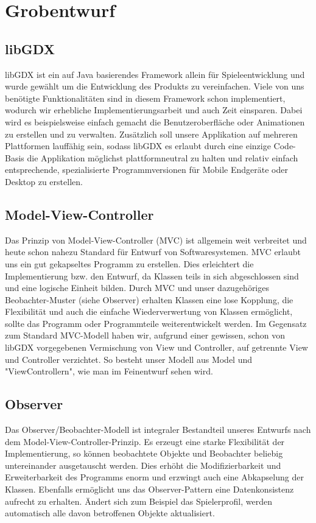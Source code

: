 \section{Grobentwurf}

\subsection{libGDX}
libGDX ist ein auf Java basierendes Framework allein für Spieleentwicklung und wurde gewählt um die Entwicklung des Produkts zu vereinfachen.
Viele von uns benötigte Funktionalitäten sind in diesem Framework schon implementiert, wodurch wir erhebliche Implementierungsarbeit und auch Zeit einsparen.
Dabei wird es beispielsweise einfach gemacht die Benutzeroberfläche oder Animationen zu erstellen und zu verwalten.
Zusätzlich soll unsere Applikation auf mehreren Plattformen lauffähig sein, sodass libGDX es erlaubt durch eine einzige Code-Basis die Applikation möglichst plattformneutral zu halten 
und relativ einfach entsprechende, spezialisierte Programmversionen für Mobile Endgeräte oder Desktop zu erstellen.

\subsection{Model-View-Controller}
Das Prinzip von Model-View-Controller (MVC) ist allgemein weit verbreitet und heute schon nahezu Standard für Entwurf von Softwaresystemen. 
MVC erlaubt uns ein gut gekapseltes Programm zu erstellen. Dies erleichtert die Implementierung bzw. den Entwurf, da Klassen teils in sich abgeschlossen sind
und eine logische Einheit bilden. Durch MVC und unser dazugehöriges Beobachter-Muster (siehe Observer) erhalten Klassen eine lose Kopplung,
die Flexibilität und auch die einfache Wiederverwertung von Klassen ermöglicht, sollte das Programm oder Programmteile weiterentwickelt werden.
Im Gegensatz zum Standard MVC-Modell haben wir, aufgrund einer gewissen, schon von libGDX vorgegebenen Vermischung von View und Controller,
auf getrennte View und Controller verzichtet. So besteht unser Modell aus Model und "ViewControllern", wie man im Feinentwurf sehen wird.

\subsection{Observer}
Das Observer/Beobachter-Modell ist integraler Bestandteil unseres Entwurfs nach dem Model-View-Controller-Prinzip.
Es erzeugt eine starke Flexibilität der Implementierung, so können beobachtete Objekte und Beobachter beliebig untereinander ausgetauscht werden.
Dies erhöht die Modifizierbarkeit und Erweiterbarkeit des Programms enorm und erzwingt auch eine Abkapselung der Klassen.
Ebenfalls ermöglicht uns das Observer-Pattern eine Datenkonsistenz aufrecht zu erhalten. Ändert sich zum Beispiel das Spielerprofil, 
werden automatisch alle davon betroffenen Objekte aktualisiert.

